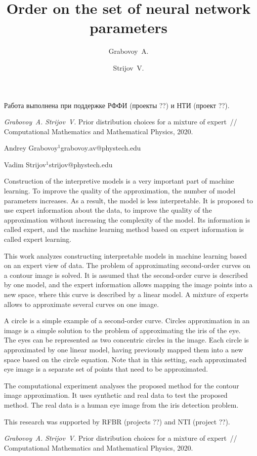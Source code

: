 \documentclass[twoside]{article}
\begin{document}
Работа выполнена при поддержке РФФИ (проекты ??) и НТИ (проект ??).

\begin{thebibliography}{1}
    \emph{Grabovoy~A.  Strijov~V.}
    Prior distribution choices for a mixture of expert~// Computational Mathematics and Mathematical Physics, 2020.
\end{thebibliography}

\English
\title{Order on the set of neural network parameters}
\author{Grabovoy~A.}{Andrey Grabovoy$^1$\speaker}{grabovoy.av@phystech.edu}
\author{Strijov~V.}{Vadim Strijov$^{1}$}{strijov@phystech.edu}
\maketitle

Construction of the interpretive models is a very important part of machine learning. To improve the quality of the approximation, the number of model parameters increases. As a result, the model is less interpretable. It is proposed to use expert information about the data, to improve the quality of the approximation without increasing the complexity of the model. Its information is called expert, and the machine learning method based on expert information is called expert learning.

This work analyzes constructing interpretable models in machine learning based on an expert view of data. The problem of approximating second-order curves on a contour image is solved. It is assumed that the second-order curve is described by one model, and the expert information allows mapping the image points into a new space, where this curve is described by a linear model. A mixture of experts allows to approximate several curves on one image.

A circle is a simple example of a second-order curve. Circles approximation in an image is a simple solution to the problem of approximating the iris of the eye. The eyes can be represented as two concentric circles in the image. Each circle is approximated by one linear model, having previously mapped them into a new space based on the circle equation. Note that in this setting, each approximated eye image is a separate set of points that need to be approximated.

The computational experiment analyses the proposed method for the contour image approximation. It uses synthetic and real data to test the proposed method. The real data is a human eye image from the iris detection problem.

This research was supported by RFBR (projects ??) and NTI (project ??).

\begin{thebibliography}{1}
    \emph{Grabovoy~A.  Strijov~V.}
    Prior distribution choices for a mixture of expert~// Computational Mathematics and Mathematical Physics, 2020.
\end{thebibliography}
\end{document}
